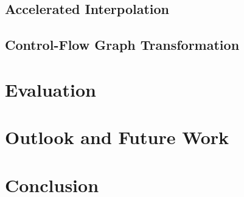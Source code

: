 \documentclass[11pt,
a4paper,
parskip=half, %
BCOR=10mm, %
ngerman, english
]{scrbook}
\begin{document}
\section{Accelerated Interpolation}

\label{accelInterpol}

\section{Control-Flow Graph Transformation}

\label{icfgTransformation}

\chapter{Evaluation}
\label{eval}


\chapter{Outlook and Future Work}
\label{futrWork}


	\setlength{\abovedisplayskip}{0.25cm}
\setlength{\belowdisplayskip}{0.25cm}
\setlength{\abovedisplayshortskip}{0.25cm}
\setlength{\belowdisplayshortskip}{0.25cm}
\chapter{Conclusion}
\label{concl}



\pagebreak



\listoffigures
\end{document}
